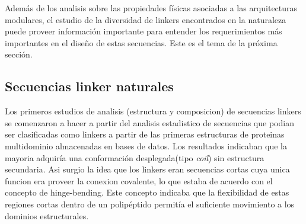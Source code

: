 Además de los analisis sobre las propiedades físicas asociadas a las arquitecturas modulares, el estudio de la diversidad de linkers encontrados en la naturaleza puede proveer información importante para entender los requerimientos
más importantes en el diseño de estas secuencias.
Este es el tema de la próxima sección.






























\subsection{Secuencias linker naturales}



Los primeros estudios de analisis (estructura y composicion) de secuencias linkers\cite{argos1990investigation} se comenzaron a hacer a partir del analisis estadistico de secuencias que podian ser clasificadas 
como linkers a partir de las primeras estructuras de proteinas multidominio almacenadas en bases de datos.
Los resultados indicaban que la mayoria adquiría una conformación desplegada(tipo \textit{coil}) sin estructura secundaria. 
Asi surgio la idea que los linkers eran secuencias cortas cuya unica funcion era proveer la conexion covalente, lo que estaba de acuerdo con el concepto de hinge-bending.
Este concepto indicaba que la flexibilidad de estas regiones cortas dentro de un polipéptido permitía el suficiente movimiento a los dominios estructurales.

